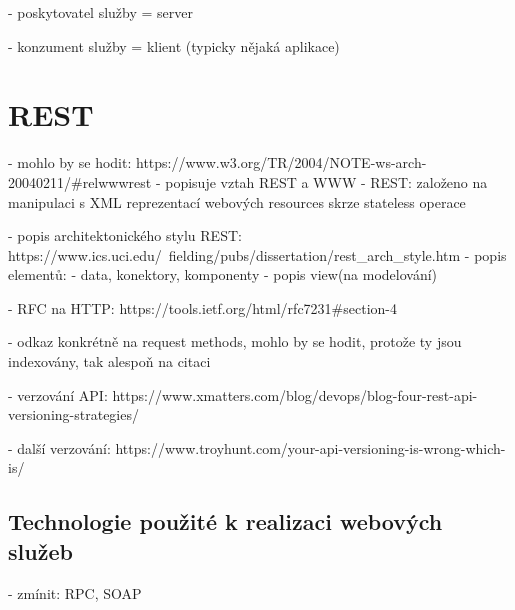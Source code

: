 \documentclass[czech,DP]{thesiskiv}
\begin{document}

- poskytovatel služby = server

- konzument služby = klient (typicky nějaká aplikace)


\section{REST}

%

- mohlo by se hodit: https://www.w3.org/TR/2004/NOTE-ws-arch-20040211/\#relwwwrest
- popisuje vztah REST a WWW
- REST: založeno na manipulaci s XML reprezentací webových resources skrze stateless operace

 - popis architektonického stylu REST: https://www.ics.uci.edu/~fielding/pubs/dissertation/rest\_arch\_style.htm
- popis elementů:
- data, konektory, komponenty
- popis view(na modelování)

- RFC na HTTP: https://tools.ietf.org/html/rfc7231\#section-4

- odkaz konkrétně na request methods, mohlo by se hodit, protože ty jsou indexovány, tak alespoň na citaci

- verzování API: https://www.xmatters.com/blog/devops/blog-four-rest-api-versioning-strategies/

- další verzování: https://www.troyhunt.com/your-api-versioning-is-wrong-which-is/

\subsection{Technologie použité k realizaci webových služeb}

- zmínit: RPC, SOAP
\end{document}
